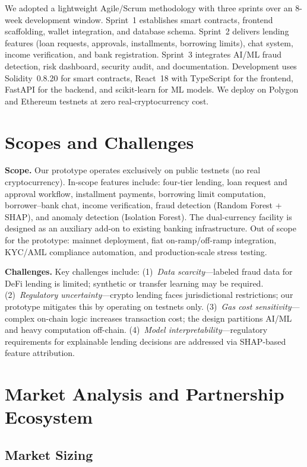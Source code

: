 \documentclass[12pt,a4paper]{report}
\begin{document}
We adopted a lightweight Agile/Scrum methodology with three sprints over an 8-week development window. Sprint~1 establishes smart contracts, frontend scaffolding, wallet integration, and database schema. Sprint~2 delivers lending features (loan requests, approvals, installments, borrowing limits), chat system, income verification, and bank registration. Sprint~3 integrates AI/ML fraud detection, risk dashboard, security audit, and documentation. Development uses Solidity~0.8.20 for smart contracts, React~18 with TypeScript for the frontend, FastAPI for the backend, and scikit-learn for ML models. We deploy on Polygon and Ethereum testnets at zero real-cryptocurrency cost.

\section{Scopes and Challenges}

\textbf{Scope.} Our prototype operates exclusively on public testnets (no real cryptocurrency). In-scope features include: four-tier lending, loan request and approval workflow, installment payments, borrowing limit computation, borrower--bank chat, income verification, fraud detection (Random Forest + SHAP), and anomaly detection (Isolation Forest). The dual-currency facility is designed as an auxiliary add-on to existing banking infrastructure. Out of scope for the prototype: mainnet deployment, fiat on-ramp/off-ramp integration, KYC/AML compliance automation, and production-scale stress testing.

\textbf{Challenges.} Key challenges include: (1)~\textit{Data scarcity}---labeled fraud data for DeFi lending is limited; synthetic or transfer learning may be required. (2)~\textit{Regulatory uncertainty}---crypto lending faces jurisdictional restrictions; our prototype mitigates this by operating on testnets only. (3)~\textit{Gas cost sensitivity}---complex on-chain logic increases transaction cost; the design partitions AI/ML and heavy computation off-chain. (4)~\textit{Model interpretability}---regulatory requirements for explainable lending decisions are addressed via SHAP-based feature attribution.

\section{Market Analysis and Partnership Ecosystem}

\subsection{Market Sizing}
\end{document}
